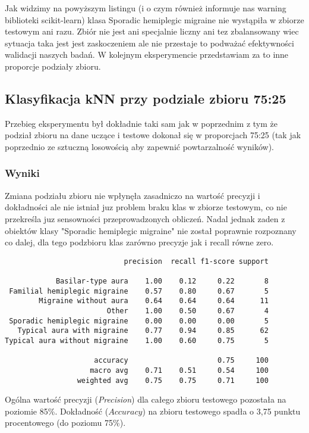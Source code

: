 Jak widzimy na powyższym listingu (i o czym również informuje nas warning biblioteki scikit-learn) klasa Sporadic hemiplegic migraine nie wystąpiła w zbiorze testowym ani razu. Zbiór nie jest ani specjalnie liczny ani tez zbalansowany wiec sytuacja taka jest jest zaskoczeniem ale nie przestaje to podważać efektywności walidacji naszych badań. W kolejnym eksperymencie przedstawiam za to inne proporcje podziały zbioru.

\subsection{Klasyfikacja kNN przy podziale zbioru 75:25}
Przebieg eksperymentu był dokładnie taki sam jak w poprzednim z tym że podział zbioru na dane uczące i testowe dokonał się w proporcjach 75:25 (tak jak poprzednio ze sztuczną losowością aby zapewnić powtarzalność wyników).\\

\subsubsection{Wyniki}
Zmiana podziału zbioru nie wpłynęła zasadniczo na wartość precyzji i dokładności ale nie istniał juz problem braku klas w zbiorze testowym, co nie przekreśla juz sensowności przeprowadzonych obliczeń. Nadal jednak zaden z obiektów klasy "Sporadic hemiplegic migraine" nie został poprawnie rozpoznany co dalej, dla tego podzbioru klas zarówno precyzje jak i recall równe zero.\\

\begin{verbatim}
                            precision  recall f1-score support

            Basilar-type aura    1.00    0.12     0.22       8
 Familial hemiplegic migraine    0.57    0.80     0.67       5
        Migraine without aura    0.64    0.64     0.64      11
                        Other    1.00    0.50     0.67       4
 Sporadic hemiplegic migraine    0.00    0.00     0.00       5
   Typical aura with migraine    0.77    0.94     0.85      62
Typical aura without migraine    1.00    0.60     0.75       5

                     accuracy                     0.75     100
                    macro avg    0.71    0.51     0.54     100
                 weighted avg    0.75    0.75     0.71     100
\end{verbatim}

Ogólna wartość precyzji (\textit{Precision}) dla całego zbioru testowego pozostała na poziomie 85\%. Dokładność ($Accuracy$) na zbioru testowego spadła o 3,75 punktu procentowego (do poziomu 75\%).\\

